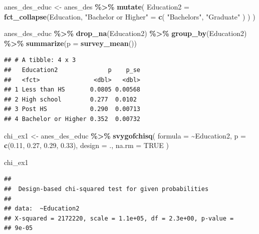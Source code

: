 \documentclass[
]{krantz}
\makeatletter
\newenvironment{Shaded}{\begin{snugshade}}{\end{snugshade}}
\newcommand{\AttributeTok}[1]{\textcolor[rgb]{0.27,0.27,0.27}{#1}}
\newcommand{\ConstantTok}[1]{\textcolor[rgb]{0.37,0.37,0.37}{#1}}
\newcommand{\FloatTok}[1]{\textcolor[rgb]{0.06,0.06,0.06}{#1}}
\newcommand{\FunctionTok}[1]{\textcolor[rgb]{0.27,0.27,0.27}{\textbf{#1}}}
\newcommand{\NormalTok}[1]{#1}
\newcommand{\OtherTok}[1]{\textcolor[rgb]{0.37,0.37,0.37}{#1}}
\newcommand{\SpecialCharTok}[1]{\textcolor[rgb]{0.43,0.43,0.43}{\textbf{#1}}}
\newcommand{\StringTok}[1]{\textcolor[rgb]{0.5,0.5,0.5}{#1}}
\newenvironment{kframe}{%
\medskip{}
\setlength{\fboxsep}{.8em}
 \def\at@end@of@kframe{}%
 \ifinner\ifhmode%
  \def\at@end@of@kframe{\end{minipage}}%
  \begin{minipage}{\columnwidth}%
 \fi\fi%
 \def\FrameCommand##1{\hskip\@totalleftmargin \hskip-\fboxsep
 \colorbox{shadecolor}{##1}\hskip-\fboxsep
     \hskip-\linewidth \hskip-\@totalleftmargin \hskip\columnwidth}%
 \MakeFramed {\advance\hsize-\width
   \@totalleftmargin\z@ \linewidth\hsize
   \@setminipage}}%
 {\par\unskip\endMakeFramed%
 \at@end@of@kframe}
\renewenvironment{Shaded}{\begin{kframe}}{\end{kframe}}
\makeatother
\begin{document}
\begin{Shaded}
\begin{Highlighting}[]
\NormalTok{anes\_des\_educ }\OtherTok{\textless{}{-}}\NormalTok{ anes\_des }\SpecialCharTok{\%\textgreater{}\%}
  \FunctionTok{mutate}\NormalTok{(}
    \AttributeTok{Education2 =}
      \FunctionTok{fct\_collapse}\NormalTok{(Education,}
        \StringTok{"Bachelor or Higher"} \OtherTok{=} \FunctionTok{c}\NormalTok{(}
          \StringTok{"Bachelor\textquotesingle{}s"}\NormalTok{,}
          \StringTok{"Graduate"}
\NormalTok{        )}
\NormalTok{      )}
\NormalTok{  )}

\NormalTok{anes\_des\_educ }\SpecialCharTok{\%\textgreater{}\%}
  \FunctionTok{drop\_na}\NormalTok{(Education2) }\SpecialCharTok{\%\textgreater{}\%}
  \FunctionTok{group\_by}\NormalTok{(Education2) }\SpecialCharTok{\%\textgreater{}\%}
  \FunctionTok{summarize}\NormalTok{(}\AttributeTok{p =} \FunctionTok{survey\_mean}\NormalTok{())}
\end{Highlighting}
\end{Shaded}

\begin{verbatim}
## # A tibble: 4 x 3
##   Education2              p    p_se
##   <fct>               <dbl>   <dbl>
## 1 Less than HS       0.0805 0.00568
## 2 High school        0.277  0.0102 
## 3 Post HS            0.290  0.00713
## 4 Bachelor or Higher 0.352  0.00732
\end{verbatim}

\begin{Shaded}
\begin{Highlighting}[]
\NormalTok{chi\_ex1 }\OtherTok{\textless{}{-}}\NormalTok{ anes\_des\_educ }\SpecialCharTok{\%\textgreater{}\%}
  \FunctionTok{svygofchisq}\NormalTok{(}
    \AttributeTok{formula =} \SpecialCharTok{\textasciitilde{}}\NormalTok{Education2,}
    \AttributeTok{p =} \FunctionTok{c}\NormalTok{(}\FloatTok{0.11}\NormalTok{, }\FloatTok{0.27}\NormalTok{, }\FloatTok{0.29}\NormalTok{, }\FloatTok{0.33}\NormalTok{),}
    \AttributeTok{design =}\NormalTok{ .,}
    \AttributeTok{na.rm =} \ConstantTok{TRUE}
\NormalTok{  )}

\NormalTok{chi\_ex1}
\end{Highlighting}
\end{Shaded}

\begin{verbatim}
## 
##  Design-based chi-squared test for given probabilities
## 
## data:  ~Education2
## X-squared = 2172220, scale = 1.1e+05, df = 2.3e+00, p-value =
## 9e-05
\end{verbatim}
\end{document}
